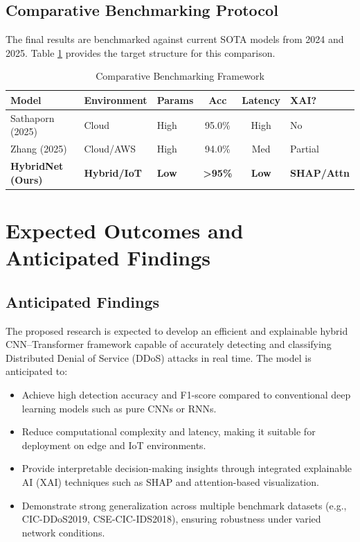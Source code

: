 \documentclass[12pt, a4paper]{report}
\begin{document}
\section{Comparative Benchmarking Protocol}
The final results are benchmarked against current SOTA models from 2024 and 2025. Table \ref{tab:benchmarking} provides the target structure for this comparison.

\begin{table}[h!]
\centering
\caption{Comparative Benchmarking Framework}
\label{tab:benchmarking}
\begin{tabular}{|l|l|l|c|c|l|}
\hline
\textbf{Model} & \textbf{Environment} & \textbf{Params} & \textbf{Acc} & \textbf{Latency} & \textbf{XAI?} \\ \hline
Sathaporn (2025) \cite{12Wahab2025} & Cloud & High & 95.0\% & High & No \\ \hline
Zhang (2025) \cite{4zhang2025intrusion_cnn_bilstm_transformer} & Cloud/AWS & High & 94.0\% & Med & Partial \\ \hline
\textbf{HybridNet (Ours)} & \textbf{Hybrid/IoT} & \textbf{Low} & \textbf{>95\%} & \textbf{Low} & \textbf{SHAP/Attn} \\ \hline
\end{tabular}
\end{table}


\chapter{Expected Outcomes and Anticipated Findings}

\section{Anticipated Findings}
The proposed research is expected to develop an efficient and explainable hybrid CNN--Transformer framework capable of accurately detecting and classifying Distributed Denial of Service (DDoS) attacks in real time. The model is anticipated to:
\begin{itemize}
    \item Achieve high detection accuracy and F1-score compared to conventional deep learning models such as pure CNNs or RNNs.
    \item Reduce computational complexity and latency, making it suitable for deployment on edge and IoT environments.
    \item Provide interpretable decision-making insights through integrated explainable AI (XAI) techniques such as SHAP and attention-based visualization.
    \item Demonstrate strong generalization across multiple benchmark datasets (e.g., CIC-DDoS2019, CSE-CIC-IDS2018), ensuring robustness under varied network conditions.
\end{itemize}
\end{document}
